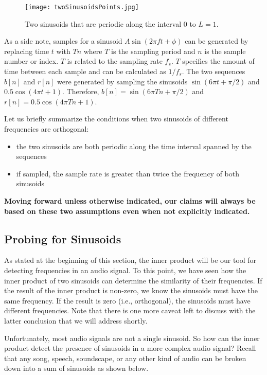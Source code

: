 \begin{figure}[h]
	\caption{Two sinusoids that are periodic along the interval 0 to $L = 1$.}
	\centering
	\texttt{[image: twoSinusoidsPoints.jpg]}
	\label{fig:twoSinesPoints}
\end{figure}

As a side note, samples for a sinusoid $A\sin(2\pi ft + \phi)$ can be generated by replacing time 
$t$ with $Tn$ where $T$ is
the sampling period and $n$ is the sample number or index.  $T$ is related to the sampling rate $f_s$.
$T$ specifies the amount of time between each sample and can be calculated as $1/f_s$.  The two
sequences $b[n]$ and $r[n]$ were generated by sampling the sinusoids $\sin(6\pi t + \pi/2)$ and
$0.5\cos(4\pi t + 1)$.  Therefore, $b[n] = \sin(6\pi Tn + \pi/2)$ and $r[n] = 0.5\cos(4\pi Tn + 1)$.

Let us briefly summarize the conditions when two sinusoids of different frequencies
are orthogonal:

\begin{itemize}
	\item the two sinusoids are both periodic along the time interval spanned by the sequences
	\item if sampled, the sample rate is greater than twice the frequency of both sinusoids
\end{itemize}

\textbf{Moving forward unless otherwise indicated, our 
claims will always be based on these two assumptions even when not explicitly indicated.}

\subsection*{Probing for Sinusoids}

As stated at the beginning of this section, the inner product will be our tool for
detecting frequencies in an audio signal.  To this point, we have seen how the inner
product of two sinusoids can determine the similarity of their frequencies.  If the result
of the inner product is non-zero, we know the sinusoids must have the same frequency.
If the result is zero (i.e., orthogonal), the sinusoids must have different frequencies.  Note that
there is one more caveat left to discuss with the latter conclusion that we will address shortly.

Unfortunately, most audio signals are not a single sinusoid.  So how can the inner product 
detect the presence of sinusoids in a more complex audio signal?
Recall that any song, speech, soundscape, or any other kind of audio can be broken down into a sum of 
sinusoids as shown below.

